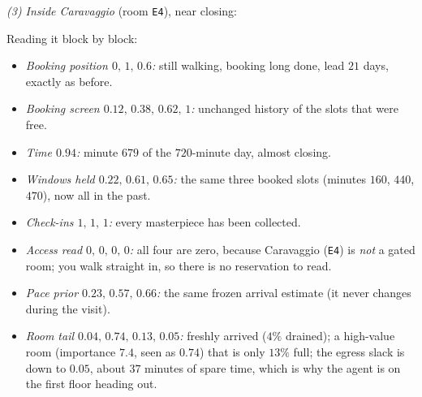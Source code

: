 \documentclass[11pt]{article}
\begin{document}
\emph{(3) Inside Caravaggio} (room \texttt{E4}), near closing:
\begin{center}\footnotesize\ttfamily
[0, 1, 0.6; 0.12, 0.38, 0.62, 1; 0.94; 0.22, 0.61, 0.65; 1,1,1; 0,0,0,0; 0.23,0.57,0.66; 0.04, 0.74, 0.13, 0.05]
\end{center}
Reading it block by block:
\begin{itemize}\setlength\itemsep{0.15em}
\item \emph{Booking position $0,\,1,\,0.6$:} still walking, booking long done, lead $21$ days, exactly as
before.
\item \emph{Booking screen $0.12,\,0.38,\,0.62,\,1$:} unchanged history of the slots that were free.
\item \emph{Time $0.94$:} minute $679$ of the $720$-minute day, almost closing.
\item \emph{Windows held $0.22,\,0.61,\,0.65$:} the same three booked slots (minutes $160$, $440$, $470$),
now all in the past.
\item \emph{Check-ins $1,\,1,\,1$:} every masterpiece has been collected.
\item \emph{Access read $0,\,0,\,0,\,0$:} all four are zero, because Caravaggio (\texttt{E4}) is \emph{not}
a gated room; you walk straight in, so there is no reservation to read.
\item \emph{Pace prior $0.23,\,0.57,\,0.66$:} the same frozen arrival estimate (it never changes during
the visit).
\item \emph{Room tail $0.04,\,0.74,\,0.13,\,0.05$:} freshly arrived ($4\%$ drained); a high-value room
(importance $7.4$, seen as $0.74$) that is only $13\%$ full; the egress slack is down to $0.05$, about
$37$ minutes of spare time, which is why the agent is on the first floor heading out.
\end{itemize}
\end{document}
